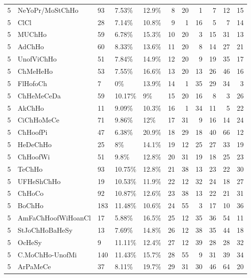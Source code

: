 \begin{longtable}{lllllrrrrrr}
  5 & NeYoPr/MoStChHo & 93 & 7.53\% & 12.9\% &   8 &  20 &   1 &   7 &  12 &  15 \\ 
  5 & ClCl & 28 & 7.14\% & 10.8\% &   9 &   1 &  16 &   5 &   7 &  14 \\ 
  5 & MUChHo & 59 & 6.78\% & 15.3\% &  10 &  20 &   3 &  15 &  31 &  13 \\ 
  5 & AdChHo & 60 & 8.33\% & 13.6\% &  11 &  20 &   8 &  14 &  27 &  21 \\ 
  5 & UnofViChHo & 51 & 7.84\% & 14.9\% &  12 &  20 &   9 &  19 &  35 &  17 \\ 
  5 & ChMeHeHo & 53 & 7.55\% & 16.6\% &  13 &  20 &  13 &  26 &  46 &  16 \\ 
  5 & FlHofoCh & 7 & 0\% & 13.9\% &  14 &   1 &  35 &  29 &  34 &   3 \\ 
  5 & ChHeMeCeDa & 59 & 10.17\% & 9\% &  15 &  20 &  16 &   8 &   3 &  26 \\ 
  5 & AkChHo & 11 & 9.09\% & 10.3\% &  16 &   1 &  34 &  11 &   5 &  22 \\ 
  5 & CiChHoMeCe & 71 & 9.86\% & 12\% &  17 &  31 &   9 &  16 &  14 &  24 \\ 
  5 & ChHoofPi & 47 & 6.38\% & 20.9\% &  18 &  29 &  18 &  40 &  66 &  12 \\ 
  5 & HeDeChHo & 25 & 8\% & 14.1\% &  19 &  12 &  25 &  27 &  33 &  19 \\ 
  5 & ChHoofWi & 51 & 9.8\% & 12.8\% &  20 &  31 &  19 &  18 &  25 &  23 \\ 
  5 & TeChHo & 93 & 10.75\% & 12.8\% &  21 &  38 &  13 &  23 &  22 &  30 \\ 
  5 & UFHeShChHo & 19 & 10.53\% & 11.9\% &  22 &  12 &  32 &  24 &  18 &  27 \\ 
  5 & ChHoCo & 92 & 10.87\% & 12.6\% &  23 &  38 &  13 &  22 &  21 &  31 \\ 
  5 & BoChHo & 183 & 11.48\% & 10.6\% &  24 &  55 &   3 &  17 &  10 &  36 \\ 
  5 & AmFaChHoofWiHoanCl & 17 & 5.88\% & 16.5\% &  25 &  12 &  35 &  36 &  54 &  11 \\ 
  5 & StJoChHoBaHeSy & 13 & 7.69\% & 14.8\% &  26 &  12 &  38 &  35 &  44 &  18 \\ 
  5 & OcHeSy & 9 & 11.11\% & 12.4\% &  27 &  12 &  39 &  28 &  28 &  32 \\ 
  5 & C.MoChHo-UnofMi & 140 & 11.43\% & 15.7\% &  28 &  55 &   9 &  31 &  39 &  34 \\ 
  5 & ArPaMeCe & 37 & 8.11\% & 19.7\% &  29 &  31 &  30 &  46 &  64 &  20 \\ 

\end{longtable}
